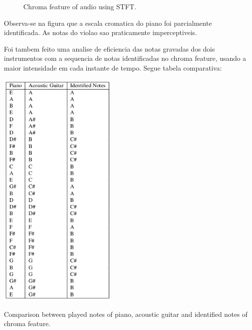 \documentclass{article}
\begin{document}
	\begin{figure}[h]
	 \centerline{}
	 \caption{Chroma feature of audio using STFT.}
	 \label{fig:2-ssft}
	\end{figure}	

	Observa-se na figura  que a escala cromatica do piano foi parcialmente identificada. As notas do violao sao praticamente imperceptiveis.

	Foi tambem feito uma analise de eficiencia das notas gravadas dos dois instrumentos com a sequencia de notas identificadas no chroma feature, usando a maior intensidade em cada instante de tempo. Segue tabela comparativa:

	\begin{table}[h]
	 \begin{center}
	 	\centerline{
	 \includegraphics[width=\columnwidth,height=12cm]{figs/tabela_2.png}}
	 \end{center}
	 \caption{Comparison between played notes of piano, acoustic guitar and identified notes of chroma feature.}
	 \label{tab:table-2-sfft}
	\end{table}
\end{document}
